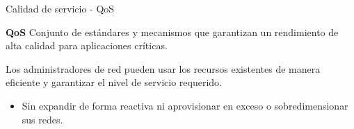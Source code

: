 \documentclass[10pt,spanish,xcolor={svgnames}]{beamer}
\begin{document}
\begin{frame}{Calidad de servicio - QoS}
\vspace*{-2em}
\begin{alertblock}{\LARGE\textbf{QoS}}
\vspace{1.2em}
Conjunto de estándares y mecanismos que garantizan un rendimiento de alta calidad para aplicaciones críticas.
\vspace{0.6em}

Los administradores de red pueden usar los recursos existentes de manera eficiente y garantizar el nivel de servicio requerido.
\begin{itemize}
\item[\rightarrow]Sin expandir de forma reactiva ni aprovisionar en exceso o sobredimensionar sus redes.
\end{itemize}
\end{alertblock}

\end{frame}


\end{document}
